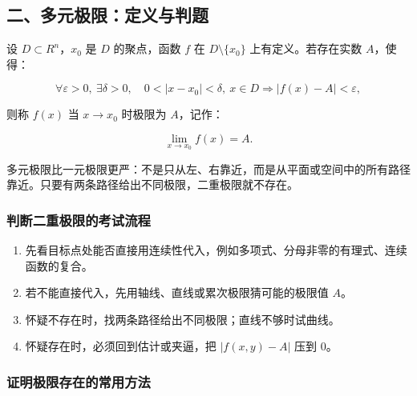 \subsection*{二、多元极限：定义与判题}

设 \(D\subset R^n\)，\(x_0\) 是 \(D\) 的聚点，函数 \(f\) 在 \(D\setminus\{x_0\}\) 上有定义。若存在实数 \(A\)，使得：

\[
      \forall \varepsilon>0,\ \exists \delta>0,\quad
      0< |x-x_0|< \delta,\ x\in D
      \Longrightarrow |f(x)-A|<\varepsilon,
    \]

则称 \(f(x)\) 当 \(x\to x_0\) 时极限为 \(A\)，记作：

\[
      \lim_{x\to x_0} f(x)=A.
    \]

\begin{notebox}
多元极限比一元极限更严：不是只从左、右靠近，而是从平面或空间中的所有路径靠近。只要有两条路径给出不同极限，二重极限就不存在。
\end{notebox}

\subsubsection*{判断二重极限的考试流程}

\begin{enumerate}
 \item 先看目标点处能否直接用连续性代入，例如多项式、分母非零的有理式、连续函数的复合。
 \item 若不能直接代入，先用轴线、直线或累次极限猜可能的极限值 \(A\)。
 \item 怀疑不存在时，找两条路径给出不同极限；直线不够时试曲线。
 \item 怀疑存在时，必须回到估计或夹逼，把 \(|f(x,y)-A|\) 压到 \(0\)。
 \end{enumerate}

\subsubsection*{证明极限存在的常用方法}

